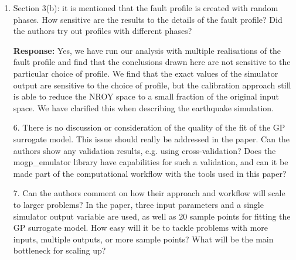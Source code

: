 \documentclass{article}
\begin{document}
\begin{enumerate}
\item Section 3(b): it is mentioned that the fault profile is created with random phases. How sensitive are the results to the details of the fault profile? Did the authors try out profiles with different phases?

  \textbf{Response:} Yes, we have run our analysis with multiple realisations
  of the fault profile and find that the conclusions drawn here are not
  sensitive to the particular choice of profile. We find that the exact
  values of the simulator output are sensitive to the choice of profile,
  but the calibration approach still is able to reduce the NROY space to
  a small fraction of the original input space. We have clarified this
  when describing the earthquake simulation.

6. There is no discussion or consideration of the quality of the fit of the GP surrogate model. This issue should really be addressed in the paper. Can the authors show any validation results, e.g. using cross-validation? Does the mogp\_emulator library have capabilities for such a validation, and can it be made part of the computational workflow with the tools used in this paper?

7. Can the authors comment on how their approach and workflow will scale to larger problems? In the paper, three input parameters and a single simulator output variable are used, as well as 20 sample points for fitting the GP surrogate model. How easy will it be to tackle problems with more inputs, multiple outputs, or more sample points? What will be the main bottleneck for scaling up?

\end{enumerate}
\end{document}
